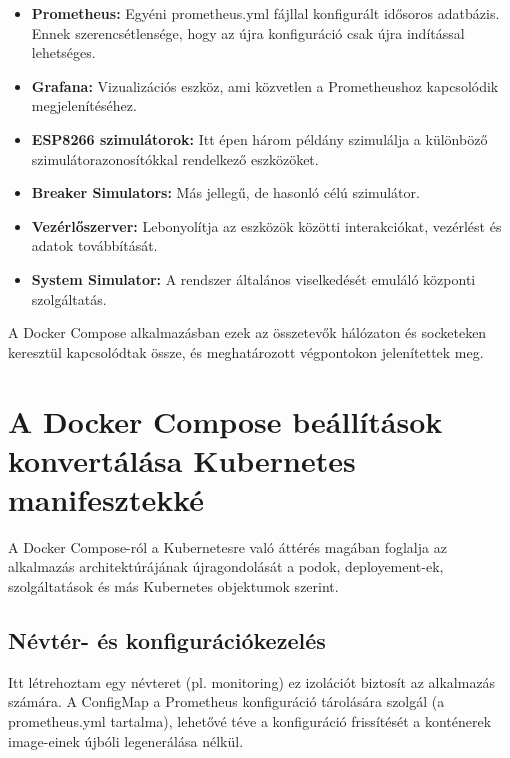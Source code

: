 \begin{itemize}
    \item \textbf{Prometheus:} Egyéni prometheus.yml fájllal konfigurált idősoros adatbázis. 
    Ennek szerencsétlensége, hogy az újra konfiguráció csak újra indítással lehetséges.
    
    \item \textbf{Grafana:} Vizualizációs eszköz, ami közvetlen a Prometheushoz kapcsolódik megjelenítéséhez.
    
    \item \textbf{ESP8266 szimulátorok:} Itt épen három példány szimulálja a különböző szimulátorazonosítókkal 
    rendelkező eszközöket.
    
    \item \textbf{Breaker Simulators:} Más jellegű, de hasonló célú szimulátor.
    
    \item \textbf{Vezérlőszerver:} Lebonyolítja az eszközök közötti interakciókat, vezérlést és adatok továbbítását.
    
    \item \textbf{System Simulator:} A rendszer általános viselkedését emuláló központi szolgáltatás.
\end{itemize}

A Docker Compose alkalmazásban ezek az összetevők hálózaton és socketeken keresztül kapcsolódtak össze, 
és meghatározott végpontokon jelenítettek meg. \cite{docker_kubernetes}

\section{A Docker Compose beállítások konvertálása Kubernetes manifesztekké}

A Docker Compose-ról a Kubernetesre való áttérés magában foglalja az alkalmazás architektúrájának 
újragondolását a podok, deployement-ek, szolgáltatások és más Kubernetes objektumok szerint. \cite{kubernetes}

\subsection{Névtér- és konfigurációkezelés}

Itt létrehoztam egy névteret (pl. monitoring) ez izolációt biztosít az alkalmazás számára. 
A ConfigMap a Prometheus konfiguráció tárolására szolgál (a prometheus.yml tartalma), 
lehetővé téve a konfiguráció frissítését a konténerek image-einek újbóli legenerálása nélkül.

